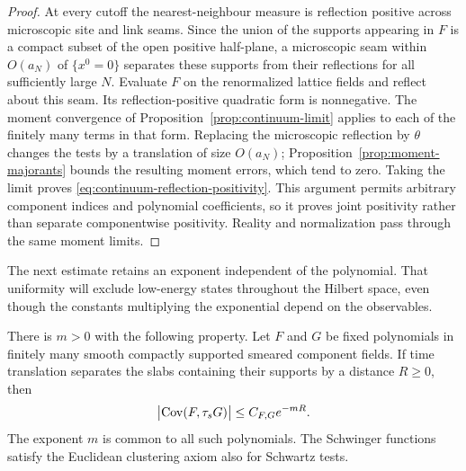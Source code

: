 \begin{proof}
At every cutoff the nearest-neighbour measure is reflection positive
across microscopic site and link seams.  Since the union of the supports
appearing in $F$ is a compact subset of the open positive half-plane, a
microscopic seam within $O(a_N)$ of $\{x^0=0\}$ separates these supports
from their reflections for all sufficiently large $N$.  Evaluate $F$ on
the renormalized lattice fields and reflect about this seam.  Its
reflection-positive quadratic form is nonnegative.  The moment
convergence of Proposition~\ref{prop:continuum-limit} applies to each of
the finitely many terms in that form.  Replacing the microscopic
reflection by $\theta$ changes the tests by a translation of size
$O(a_N)$; Proposition~\ref{prop:moment-majorants} bounds the resulting
moment errors, which tend to zero.  Taking the limit proves
\eqref{eq:continuum-reflection-positivity}.  This argument permits
arbitrary component indices and polynomial coefficients, so it proves
joint positivity rather than separate componentwise positivity.
Reality and normalization pass through the same moment limits.
\end{proof}

The next estimate retains an exponent independent of the polynomial.
That uniformity will exclude low-energy states throughout the Hilbert
space, even though the constants multiplying the exponential depend on
the observables.

\begin{proposition}
\label{prop:slab-clustering}
There is $m>0$ with the following property.  Let $F$ and $G$ be fixed
polynomials in finitely many smooth compactly supported smeared
component fields.  If time translation separates the slabs containing
their supports by a distance $R\ge0$, then
\begin{equation}
 \bigl|\operatorname{Cov}(F,\tau_sG)\bigr|
       \le C_{F,G}e^{-mR}.
 \label{eq:polynomial-slab-clustering}
\end{equation}
The exponent $m$ is common to all such polynomials.  The Schwinger
functions satisfy the Euclidean clustering axiom also for Schwartz
tests.
\end{proposition}

